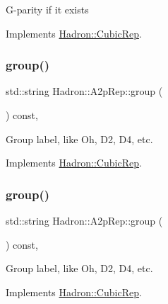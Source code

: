 G-\/parity if it exists 

Implements \mbox{\hyperlink{structHadron_1_1CubicRep_a52104e43266d1614c00bbd1c3b395458}{Hadron\+::\+Cubic\+Rep}}.

\mbox{\label{structHadron_1_1A2pRep_a6a7ca57a0cc2ab597b89fb7e07a3cf26}} 
\subsubsection{\texorpdfstring{group()}{group()}\hspace{0.1cm}{\footnotesize\ttfamily [1/2]}}
{\footnotesize\ttfamily std\+::string Hadron\+::\+A2p\+Rep\+::group (\begin{DoxyParamCaption}{ }\end{DoxyParamCaption}) const\hspace{0.3cm}{\ttfamily [inline]}, {\ttfamily [virtual]}}

Group label, like Oh, D2, D4, etc. 

Implements \mbox{\hyperlink{structHadron_1_1CubicRep_a0748f11ec87f387062c8e8981339a29c}{Hadron\+::\+Cubic\+Rep}}.

\mbox{\label{structHadron_1_1A2pRep_a6a7ca57a0cc2ab597b89fb7e07a3cf26}} 
\subsubsection{\texorpdfstring{group()}{group()}\hspace{0.1cm}{\footnotesize\ttfamily [2/2]}}
{\footnotesize\ttfamily std\+::string Hadron\+::\+A2p\+Rep\+::group (\begin{DoxyParamCaption}{ }\end{DoxyParamCaption}) const\hspace{0.3cm}{\ttfamily [inline]}, {\ttfamily [virtual]}}

Group label, like Oh, D2, D4, etc. 

Implements \mbox{\hyperlink{structHadron_1_1CubicRep_a0748f11ec87f387062c8e8981339a29c}{Hadron\+::\+Cubic\+Rep}}.

\mbox{\label{structHadron_1_1A2pRep_a3ced5497d56bb36345560c2e3cb3d2e7}} 

